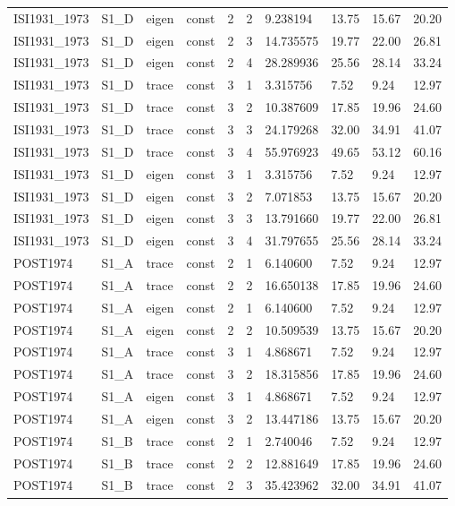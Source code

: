 \begin{tabular}{llllllllll}
ISI1931\_1973 & S1\_D & eigen & const & 2 & 2 & 9.238194 & 13.75 & 15.67 & 20.20 \\
ISI1931\_1973 & S1\_D & eigen & const & 2 & 3 & 14.735575 & 19.77 & 22.00 & 26.81 \\
ISI1931\_1973 & S1\_D & eigen & const & 2 & 4 & 28.289936 & 25.56 & 28.14 & 33.24 \\
ISI1931\_1973 & S1\_D & trace & const & 3 & 1 & 3.315756 & 7.52 & 9.24 & 12.97 \\
ISI1931\_1973 & S1\_D & trace & const & 3 & 2 & 10.387609 & 17.85 & 19.96 & 24.60 \\
ISI1931\_1973 & S1\_D & trace & const & 3 & 3 & 24.179268 & 32.00 & 34.91 & 41.07 \\
ISI1931\_1973 & S1\_D & trace & const & 3 & 4 & 55.976923 & 49.65 & 53.12 & 60.16 \\
ISI1931\_1973 & S1\_D & eigen & const & 3 & 1 & 3.315756 & 7.52 & 9.24 & 12.97 \\
ISI1931\_1973 & S1\_D & eigen & const & 3 & 2 & 7.071853 & 13.75 & 15.67 & 20.20 \\
ISI1931\_1973 & S1\_D & eigen & const & 3 & 3 & 13.791660 & 19.77 & 22.00 & 26.81 \\
ISI1931\_1973 & S1\_D & eigen & const & 3 & 4 & 31.797655 & 25.56 & 28.14 & 33.24 \\
POST1974 & S1\_A & trace & const & 2 & 1 & 6.140600 & 7.52 & 9.24 & 12.97 \\
POST1974 & S1\_A & trace & const & 2 & 2 & 16.650138 & 17.85 & 19.96 & 24.60 \\
POST1974 & S1\_A & eigen & const & 2 & 1 & 6.140600 & 7.52 & 9.24 & 12.97 \\
POST1974 & S1\_A & eigen & const & 2 & 2 & 10.509539 & 13.75 & 15.67 & 20.20 \\
POST1974 & S1\_A & trace & const & 3 & 1 & 4.868671 & 7.52 & 9.24 & 12.97 \\
POST1974 & S1\_A & trace & const & 3 & 2 & 18.315856 & 17.85 & 19.96 & 24.60 \\
POST1974 & S1\_A & eigen & const & 3 & 1 & 4.868671 & 7.52 & 9.24 & 12.97 \\
POST1974 & S1\_A & eigen & const & 3 & 2 & 13.447186 & 13.75 & 15.67 & 20.20 \\
POST1974 & S1\_B & trace & const & 2 & 1 & 2.740046 & 7.52 & 9.24 & 12.97 \\
POST1974 & S1\_B & trace & const & 2 & 2 & 12.881649 & 17.85 & 19.96 & 24.60 \\
POST1974 & S1\_B & trace & const & 2 & 3 & 35.423962 & 32.00 & 34.91 & 41.07 \\

\end{tabular}
